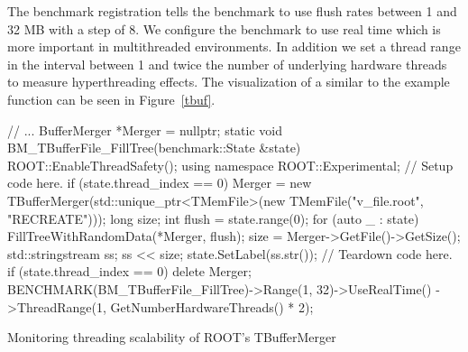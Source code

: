 \documentclass{webofc}
\begin{document}
The benchmark registration tells the benchmark to use flush rates between 1 and 32 MB with a step of 8. We  configure the benchmark to use real time which is more important in multithreaded environments. In addition we set a thread range in the interval between 1 and twice the number of underlying hardware threads to measure hyperthreading effects. The visualization of a similar to the example function can be seen in Figure~\ref{tbuf}.

\begin{listing}[h]
   \noindent
   \begin{minipage}[h]{.7\textwidth}
   \begin{cppcode*}{}
   // ...
   BufferMerger *Merger = nullptr;
   static void BM_TBufferFile_FillTree(benchmark::State &state) {
      ROOT::EnableThreadSafety();
      using namespace ROOT::Experimental;
      // Setup code here.
      if (state.thread_index == 0)
         Merger = new TBufferMerger(std::unique_ptr<TMemFile>(new TMemFile("v_file.root",
                                                                           "RECREATE")));
      long size;
      int flush = state.range(0);
      for (auto _ : state) {
         FillTreeWithRandomData(*Merger, flush);
         size = Merger->GetFile()->GetSize();
      }
      std::stringstream ss;
      ss << size;
      state.SetLabel(ss.str());
      // Teardown code here.
      if (state.thread_index == 0)
         delete Merger;
   }
   BENCHMARK(BM_TBufferFile_FillTree)->Range(1, 32)->UseRealTime()
                                     ->ThreadRange(1, GetNumberHardwareThreads() * 2);
   \end{cppcode*}
   \end{minipage}
   \caption{Monitoring threading scalability of ROOT's TBufferMerger}
   \label{thread_bench}
\end{listing}


\end{document}
